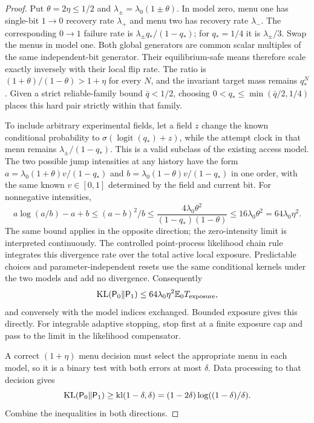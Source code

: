\begin{proof}
Put $\theta=2\eta\le1/2$ and
$\lambda_\pm=\lambda_0(1\pm\theta)$.
In model zero, menu one has single-bit $1\to0$ recovery rate $\lambda_+$
and menu two has recovery rate $\lambda_-$. The corresponding $0\to1$
failure rate is $\lambda_\pm q_* /(1-q_*)$; for $q_*=1/4$ it is
$\lambda_\pm/3$. Swap the menus in model one.
Both global generators are common scalar multiples of the same
independent-bit generator. Their equilibrium-safe means therefore scale
exactly inversely with their local flip rate. The ratio is
$(1+\theta)/(1-\theta)>1+\eta$ for every $N$, and the invariant target
mass remains $q_*^N$. Given a strict reliable-family bound
$\bar q<1/2$, choosing $0<q_*\le\min(\bar q/2,1/4)$ places this hard
pair strictly within that family.

To include arbitrary experimental fields, let a field $z$ change the
known conditional probability to $\sigma(\operatorname{logit}(q_*)+z)$,
while the attempt clock in that menu remains $\lambda_\pm/(1-q_*)$.
This is a valid subclass of the
existing access model. The two possible jump intensities at any history
have the form $a=\lambda_0(1+\theta)v/(1-q_*)$ and
$b=\lambda_0(1-\theta)v/(1-q_*)$ in one order, with the same known
$v\in[0,1]$ determined by the field and current bit.
For nonnegative intensities,
\[
 a\log(a/b)-a+b\le (a-b)^2/b
 \le\frac{4\lambda_0\theta^2}{(1-q_*)(1-\theta)}
 \le16\lambda_0\theta^2=64\lambda_0\eta^2.
\]
The same bound applies in the opposite direction; the zero-intensity
limit is interpreted continuously. The controlled point-process
likelihood chain rule integrates this divergence rate over the total
active local exposure. Predictable choices and parameter-independent
resets use the same conditional kernels under the two models and add
no divergence. Consequently
\[
 \operatorname{KL}(\mathsf P_0\Vert\mathsf P_1)
 \le64\lambda_0\eta^2\mathbb E_0T_{\rm exposure},
\]
and conversely with the model indices exchanged. Bounded exposure gives
this directly. For integrable adaptive stopping, stop first at a finite
exposure cap and pass to the limit in the likelihood compensator.

A correct $(1+\eta)$ menu decision must select the appropriate menu in
each model, so it is a binary test with both errors at most $\delta$.
Data processing to that decision gives
\[
 \operatorname{KL}(\mathsf P_0\Vert\mathsf P_1)
 \ge \operatorname{kl}(1-\delta,\delta)
 =(1-2\delta)\log((1-\delta)/\delta).
\]
Combine the inequalities in both directions.
\end{proof}

